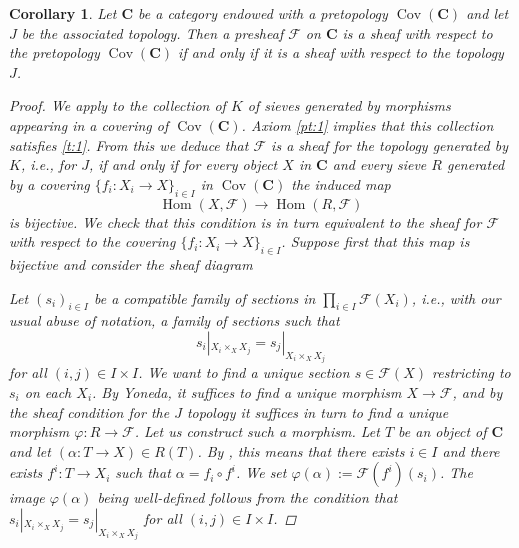 \documentclass[12pt,reqno,a4paper]{amsart}
\theoremstyle{plain}
\newtheorem{cor}[thm]{Corollary}
\theoremstyle{definition}
\theoremstyle{remark}
\begin{document}
\begin{cor}\label{cor:sheaves}
  Let $\mathbf{C}$ be a category endowed with a pretopology $\operatorname{Cov}(\mathbf{C})$ and let $J$ be the associated topology.
  Then a presheaf $\mathscr{F}$ on $\mathbf{C}$ is a sheaf with respect to the pretopology $\operatorname{Cov}(\mathbf{C})$ if and only if it is a sheaf with respect to the topology $J$.
  \begin{proof}
    We apply  to the collection of $K$ of sieves generated by morphisms appearing in a covering of $\operatorname{Cov}(\mathbf{C})$.
    Axiom \ref{pt:1} implies that this collection satisfies \ref{t:1}.
    From this we deduce that $\mathscr{F}$ is a sheaf for the topology generated by $K$, i.e., for $J$, if and only if for every object $X$ in $\mathbf{C}$ and every sieve $R$ generated by a covering $\{ f_{i} \colon X_{i} \to X\}_{i \in I}$ in $\operatorname{Cov}(\mathbf{C})$ the induced map
    \[ \operatorname{Hom}(X,\mathscr{F}) \to \operatorname{Hom}(R,\mathscr{F}) \]
    is bijective.
    We check that this condition is in turn equivalent to the sheaf for $\mathscr{F}$ with respect to the covering $\{ f_{i} \colon X_{i} \to X \}_{i \in I}$.
    Suppose first that this map is bijective and consider the sheaf diagram
    \begin{center}
    \end{center}
    Let $(s_{i})_{i \in I}$ be a compatible family of sections in $\prod_{i \in I} \mathscr{F}(X_{i})$, i.e., with our usual abuse of notation, a family of sections such that
    \[ s_{i}|_{X_{i} \times_{X} X_{j}} = s_{j}|_{X_{i} \times_{X} X_{j}} \]
    for all $(i,j) \in I \times I$.
    We want to find a unique section $s \in \mathscr{F}(X)$ restricting to $s_{i}$ on each $X_{i}$.
    By Yoneda, it suffices to find a unique morphism $X \to \mathscr{F}$, and by the sheaf condition for the $J$ topology it suffices in turn to find a unique morphism $\varphi \colon R \to \mathscr{F}$.
    Let us construct such a morphism.
    Let $T$ be an object of $\mathbf{C}$ and let $(\alpha \colon T \to X) \in R(T)$.
    By , this means that there exists $i \in I$ and there exists $f^{i} \colon T \to X_{i}$ such that $\alpha = f_{i} \circ f^{i}$.
    We set $\varphi(\alpha) := \mathscr{F}(f^{i})(s_{i})$.
    The image $\varphi(\alpha)$ being well-defined follows from the condition that $s_{i}|_{X_{i} \times_{X} X_{j}} = s_{j}|_{X_{i} \times_{X} X_{j}}$ for all $(i, j) \in I \times I$.


\end{proof}
\end{cor}
\end{document}
